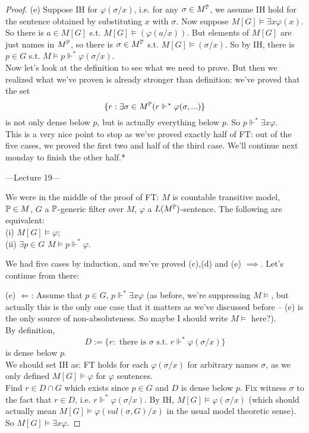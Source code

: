 \documentclass[a4paper]{article}
\begin{document}
\begin{proof}
(e) Suppose IH for $\varphi(\sigma/x)$, i.e. for any $\sigma \in M^\P$, we assume IH hold for the sentence obtained by substituting $x$ with $\sigma$. Now suppose $M[G] \vDash \exists x \varphi(x)$. So there is $a \in M[G]$ s.t. $M[G] \vDash(\varphi(a/x))$. But elements of $M[G]$ are just names in $M^\P$, so there is $\sigma \in M^\P$ s.t. $M[G] \vDash(\sigma/x)$. So by IH, there is $p \in G$ s.t. $M \vDash p \Vdash^* \varphi(\sigma/x)$.\\
Now let's look at the definition to see what we need to prove. But then we realized what we've proven is already stronger than definition: we've proved that the set
\[
\{r: \exists \sigma \in M^\P (r \Vdash^* \varphi(\sigma,...)\}
\]
is not only dense below $p$, but is actually everything below $p$. So $p \Vdash^* \exists x \varphi$.\\
This is a very nice point to stop as we've proved exactly half of FT: out of the five cases, we proved the first two and half of the third case. We'll continue next monday to finish the other half.*

---Lecture 19---

We were in the middle of the proof of FT: $M$ is countable transitive model, $\P \in M$, $G$ a $\P$-generic filter over $M$, $\varphi$ a $L(M^\P)$-sentence. The following are equivalent:\\
(i) $M[G] \vDash \varphi$;\\
(ii) $\exists p \in G$ $M \vDash p \Vdash^* \varphi$.

We had five cases by induction, and we've proved (c),(d) and (e) $\implies$. Let's continue from there:

(e) $\Leftarrow$: Assume that $p \in G$, $p \Vdash^* \exists x \varphi$ (as before, we're suppressing $M\vDash$, but actually this is the only one case that it matters as we've discussed before -- (e) is the only source of non-absoluteness. So maybe I should write $M\vDash$ here?).\\
By definition, 
\[
D:= \{r: \text{ there is } \sigma \text{ s.t. } r \Vdash^* \varphi(\sigma/x)\}
\]
is dense below $p$.\\
We should set IH as: FT holds for each $\varphi(\sigma/x)$ for arbitrary names $\sigma$, as we only defined $M[G] \vDash \varphi$ for $\varphi$ sentences.\\
Find $r \in D\cap G$ which exists since $p \in G$ and $D$ is dense below $p$. Fix witness $\sigma$ to the fact that $r \in D$, i.e. $r \Vdash^* \varphi(\sigma/x)$. By IH, $M[G] \vDash \varphi(\sigma/x)$ (which should actually mean $M[G] \vDash \varphi(val(\sigma,G)/x)$ in the usual model theoretic sense). So $M[G] \vDash \exists x \varphi$.


\end{proof}
\end{document}

